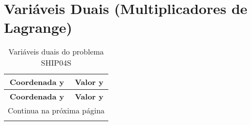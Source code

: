 \documentclass[12pt]{article}
\begin{document}
\section{Variáveis Duais (Multiplicadores de Lagrange)}

\begin{longtable}{@{}cc@{}}
\caption{Variáveis duais do problema SHIP04S} \\
\toprule
\textbf{Coordenada y} & \textbf{Valor y} \\
\midrule
\endfirsthead

\toprule
\textbf{Coordenada y} & \textbf{Valor y} \\
\midrule
\endhead

\midrule \multicolumn{2}{r}{{Continua na próxima página}} \\ \midrule
\endfoot


\end{longtable}
\end{document}
